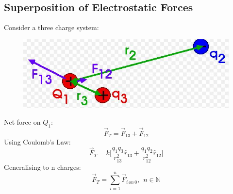 \documentclass[a4paper, 11pt, normalem]{report}
\begin{document}
\chapter{}
\section{Superposition of Electrostatic Forces}
Consider a three charge system:
\begin{figure}[H]
    \centering
    \includegraphics{3Force.JPG}
\end{figure}
Net force on $Q_{1}$:
\begin{equation}
    \vec{F}_{T} = \vec{F}_{13} + \vec{F}_{12}
\end{equation}
Using Coulomb's Law:
\begin{equation}
    \vec{F}_{T} = k\Big[\frac{q_{1}q_{3}}{r_{13}^{2}}\hat{r}_{13} + \frac{q_{1}q_{2}}{r_{12}^{2}}\hat{r}_{12}\Big]
\end{equation}
Generalising to n charges:
\begin{equation}
    \vec{F}_{T} = \sum_{i = 1}^{n} \vec{F}_{i\,on\,0},~~n \in \mathbb{N}
\end{equation}
\end{document}
